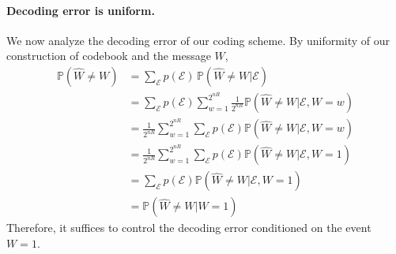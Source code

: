 \documentclass{article}
\numberwithin{equation}{section}
\newcommand{\bbP}{\mathbb{P}}
\renewcommand{\cal}{\mathcal}
\newcommand{\wh}{\widehat}
\theoremstyle{plain}
\theoremstyle{definition}
\begin{document}
\paragraph{Decoding error is uniform.} We now analyze the decoding error of our coding scheme. By uniformity of our construction of codebook and the message $W$,
\begin{align*}
	\bbP(\wh{W}\neq W)&=\sum_{\cal{E}}p(\cal{E})\,\bbP(\wh{W}\neq W|\cal{E})\\
	&=\sum_{\cal{E}}p(\cal{E})\sum_{w=1}^{2^{nR}}\frac{1}{2^{nR}}\bbP(\wh{W}\neq W|\cal{E},W=w)\\
	&=\frac{1}{2^{nR}}\sum_{w=1}^{2^{nR}}\sum_{\cal{E}}p(\cal{E})\bbP(\wh{W}\neq W|\cal{E},W=w)\\
	&=\frac{1}{2^{nR}}\sum_{w=1}^{2^{nR}}\sum_{\cal{E}}p(\cal{E})\bbP(\wh{W}\neq W|\cal{E},W=1)\\
	&=\sum_{\cal{E}}p(\cal{E})\bbP(\wh{W}\neq W|\cal{E},W=1)\\
	&=\bbP(\wh{W}\neq W|W=1)
\end{align*}
Therefore, it suffices to control the decoding error conditioned on the event $W=1$.
\end{document}
